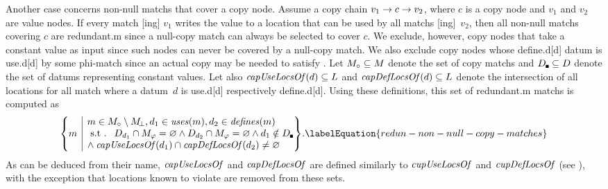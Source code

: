 Another case concerns non-\glspl{null match} that cover a \gls{copy node}.
%
Assume a copy chain \mbox{$v_1 \rightarrow c \rightarrow v_2$}, where $c$ is a
\gls{copy node} and $v_1$ and $v_2$ are \glspl{value node}.
%
If every \gls{match} [ing] $v_1$ writes the value to a
\gls{location} that can be used by all \glspl{match}
[ing]~$v_2$, then all non-\glspl{null match} covering $c$ are
\gls{redundant.m} since a \gls{null-copy match} can always be selected to cover
$c$.
%
We exclude, however, \glspl{copy node} that take a constant value as input since
such \glspl{node} can never be covered by a \gls{null-copy match}.
%
We also exclude \glspl{copy node} whose \gls{define.d}[d] \gls{datum} is
\gls{use.d}[d] by some \gls{phi-match} since an actual copy may be needed to
satisfy .
%
Let \mbox{$\mCopyMatchSet \subseteq \mMatchSet$} denote the set of \glspl{copy
  match} and \mbox{$\mConstDataSet \subseteq \mDataSet$} denote the set of
\glspl{datum} representing constant values.
%
Let also \mbox{$\operatorname{\textrm{\textit{capUseLocsOf}}}(d) \subseteq L$} and
\mbox{$\operatorname{\textrm{\textit{capDefLocsOf}}}(d) \subseteq L$} denote the intersection of
all \glspl{location} for all \gls{match} where a \gls{datum}~$d$ is
\gls{use.d}[d] respectively \gls{define.d}[d].
%
Using these definitions, this set of \gls{redundant.m} \glspl{match} is computed as
%
\begin{equation}
  \mSetBuilder*{m}%
               {%
                 \begin{array}{@{}l@{}}
                   m \in \mCopyMatchSet \setminus \mNullMatchSet,
                   d_1 \in \mUses(m),
                   d_2 \in \mDefines(m) \\
                   \text{\st }
                   \mDataSet[d_1] \cap \mPhiMatchSet = \mEmptySet
                   \mAnd
                   \mDataSet[d_2] \cap \mPhiMatchSet = \mEmptySet
                   \mAnd
                   d_1 \notin \mConstDataSet \\
                   \mbox{}\hspace{-2pt} \mAnd
                   \mCapUseLocsOf(d_1) \cap \mCapDefLocsOf(d_2) \neq \mEmptySet
                 \end{array}
               }\!.
  \labelEquation{redun-non-null-copy-matches}
\end{equation}
%
As can be deduced from their name, $\operatorname{\textrm{\textit{capUseLocsOf}}}$ and $\operatorname{\textrm{\textit{capDefLocsOf}}}$ are
defined similarly to $\operatorname{\textrm{\textit{cupUseLocsOf}}}$ and $\operatorname{\textrm{\textit{cupDefLocsOf}}}$ (see
), with the
exception that \glspl{location} known to violate
 are removed from these sets.


